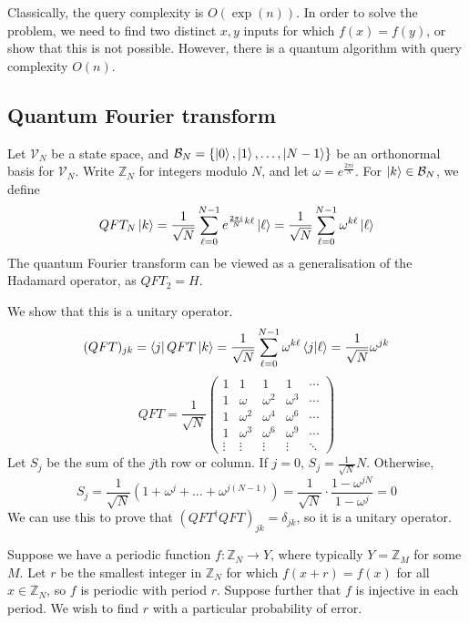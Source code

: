 Classically, the query complexity is \( O(\exp(n)) \).
In order to solve the problem, we need to find two distinct \( x, y \) inputs for which \( f(x) = f(y) \), or show that this is not possible.
However, there is a quantum algorithm with query complexity \( O(n) \).

\subsection{Quantum Fourier transform}
Let \( \mathcal V_N \) be a state space, and \( \mathcal B_N = \qty{\ket{0}, \ket{1}, \dots, \ket{N-1}} \) be an orthonormal basis for \( \mathcal V_N \).
Write \( \mathbb Z_N \) for integers modulo \( N \), and let \( \omega = e^{\frac{2\pi i}{N}} \).
For \( \ket{k} \in \mathcal B_N \), we define
\[ QFT_N\ket{k} = \frac{1}{\sqrt{N}} \sum_{\ell=0}^{N-1} e^{\frac{2\pi i}{N}k\ell} \ket{\ell} = \frac{1}{\sqrt{N}} \sum_{\ell=0}^{N-1} \omega^{k\ell} \ket{\ell} \]
The quantum Fourier transform can be viewed as a generalisation of the Hadamard operator, as \( QFT_2 = H \).

We show that this is a unitary operator.
\[ (QFT)_{jk} = \bra{j}QFT\ket{k} = \frac{1}{\sqrt{N}} \sum_{\ell=0}^{N-1} \omega^{k\ell} \ip{j}{\ell} = \frac{1}{\sqrt{N}} \omega^{jk} \]
\[ QFT = \frac{1}{\sqrt{N}} \begin{pmatrix}
    1 & 1 & 1 & 1 & \cdots \\
    1 & \omega & \omega^2 & \omega^3 & \cdots \\
    1 & \omega^2 & \omega^4 & \omega^6 & \cdots \\
    1 & \omega^3 & \omega^6 & \omega^9 & \cdots \\
    \vdots & \vdots & \vdots & \vdots & \ddots
\end{pmatrix} \]
Let \( S_j \) be the sum of the \( j \)th row or column.
If \( j = 0 \), \( S_j = \frac{1}{\sqrt{N}} N \).
Otherwise,
\[ S_j = \frac{1}{\sqrt{N}} (1 + \omega^j + \dots + \omega^{j(N-1)}) = \frac{1}{\sqrt{N}} \cdot \frac{1 - \omega^{jN}}{1 - \omega^j} = 0 \]
We can use this to prove that \( (QFT^\dagger QFT)_{jk} = \delta_{jk} \), so it is a unitary operator.

Suppose we have a periodic function \( f \colon \mathbb Z_N \to Y \), where typically \( Y = \mathbb Z_M \) for some \( M \).
Let \( r \) be the smallest integer in \( \mathbb Z_N \) for which \( f(x+r) = f(x) \) for all \( x \in \mathbb Z_N \), so \( f \) is periodic with period \( r \).
Suppose further that \( f \) is injective in each period.
We wish to find \( r \) with a particular probability of error.

